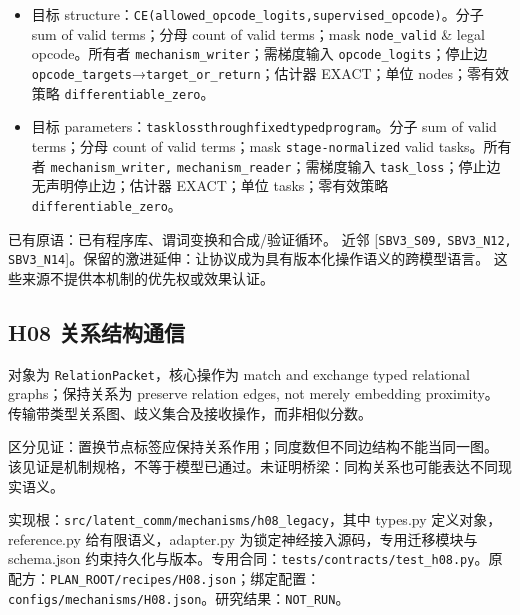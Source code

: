 \documentclass[
  10pt,
]{article}
\begin{document}
\begin{itemize}
\item
  目标
  structure：{\small\nolinkurl{CE(allowed_opcode_logits,supervised_opcode)}}。分子
  sum of valid terms；分母 count of valid terms；mask
  \nolinkurl{node_valid} \& legal opcode。所有者
  \nolinkurl{mechanism_writer}；需梯度输入
  \nolinkurl{opcode_logits}；停止边
  \nolinkurl{opcode_targets}→\nolinkurl{target_or_return}；估计器
  EXACT；单位 nodes；零有效策略 \nolinkurl{differentiable_zero}。
\item
  目标
  parameters：{\small\nolinkurl{task}\hspace{0.333em}\nolinkurl{loss}\hspace{0.333em}\nolinkurl{through}\hspace{0.333em}\nolinkurl{fixed}\hspace{0.333em}\nolinkurl{typed}\hspace{0.333em}\nolinkurl{program}}。分子
  sum of valid terms；分母 count of valid terms；mask
  \nolinkurl{stage-normalized} valid tasks。所有者
  \nolinkurl{mechanism_writer,} \nolinkurl{mechanism_reader}；需梯度输入
  \nolinkurl{task_loss}；停止边 无声明停止边；估计器 EXACT；单位
  tasks；零有效策略 \nolinkurl{differentiable_zero}。
\end{itemize}

已有原语：已有程序库、谓词变换和合成/验证循环。 近邻
{[}\nolinkurl{SBV3_S09,} \nolinkurl{SBV3_N12,}
\nolinkurl{SBV3_N14}{]}。保留的激进延伸：让协议成为具有版本化操作语义的跨模型语言。
这些来源不提供本机制的优先权或效果认证。

\subsection{H08
关系结构通信}\label{h08-ux5173ux7cfbux7ed3ux6784ux901aux4fe1}

对象为 \nolinkurl{RelationPacket}，核心操作为 match and exchange typed
relational graphs；保持关系为 preserve relation edges, not merely
embedding
proximity。传输带类型关系图、歧义集合及接收操作，而非相似分数。

区分见证：置换节点标签应保持关系作用；同度数但不同边结构不能当同一图。
该见证是机制规格，不等于模型已通过。未证明桥梁：同构关系也可能表达不同现实语义。

实现根：{\small\nolinkurl{src/latent_comm/mechanisms/h08_legacy}}，其中
types.py 定义对象，reference.py 给有限语义，adapter.py
为锁定神经接入源码，专用迁移模块与 schema.json
约束持久化与版本。专用合同：{\small\nolinkurl{tests/contracts/test_h08.py}}。原配方：{\small\nolinkurl{PLAN_ROOT/recipes/H08.json}}；绑定配置：{\small\nolinkurl{configs/mechanisms/H08.json}}。研究结果：\nolinkurl{NOT_RUN}。
\end{document}

